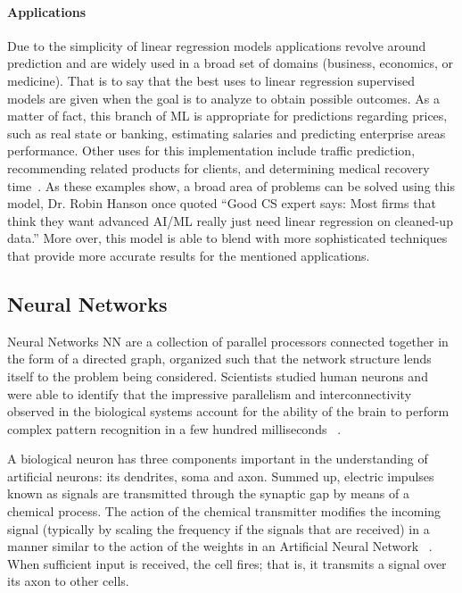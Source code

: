 \paragraph{Applications}

Due to the simplicity of linear regression models applications revolve around prediction and are 
widely used in a broad set of domains (\eg business, economics, or medicine). That is to say that the 
best uses to linear regression supervised models are given when the goal is to analyze to obtain 
possible outcomes. As a matter of fact, this branch of \ac{ML} is appropriate for predictions regarding 
prices, such as real state or banking, estimating salaries and predicting enterprise areas performance. 
Other uses for this implementation include traffic prediction, recommending related products for 
clients, and determining medical recovery time~\cite{grandeur17}. As these examples show, a broad 
area of  problems can be solved using this model, Dr. Robin Hanson once quoted “Good CS expert 
says: Most firms that think they want advanced AI/ML really just need linear regression on cleaned-up 
data.” More over, this model is able to blend with more sophisticated techniques that provide more 
accurate results for the mentioned applications. 


\subsection{Neural Networks}

Neural Networks \ac{NN}  are a collection of parallel processors connected together in the form of a directed graph, organized such that the network structure lends itself to the problem being considered. Scientists studied human neurons and were able to identify that the impressive parallelism and interconnectivity observed in the biological systems account for the ability of the brain to perform complex pattern recognition in a few hundred milliseconds ~\cite{freeman91}.

A biological neuron has three components important in the understanding of artificial neurons: its dendrites, soma and axon. Summed up, electric impulses known as signals are transmitted through the synaptic gap by means of a chemical process. The action of the chemical transmitter modifies the incoming signal (typically by scaling the frequency if the signals that are received) in a manner similar to the action of the weights in an Artificial Neural Network ~\cite{fausett93}. When sufficient input is received, the cell fires; that is, it transmits a signal over its axon to other cells. 

